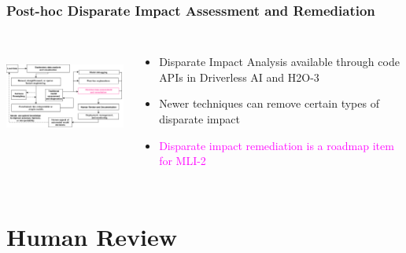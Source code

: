 \documentclass[11pt,
               aspectratio=169,
               hyperref={colorlinks}
               ]{beamer}
\begin{document}
		\begin{frame}
		
			\frametitle{Post-hoc Disparate Impact Assessment and Remediation}		
			
			\begin{columns}
	
				\centering
				\includegraphics[height=100pt]{img/fair.png}
				
				\vspace{-5pt}
				\begin{itemize}
					\item Disparate Impact Analysis available through code APIs in Driverless AI and H2O-3
					\item Newer techniques can remove certain types of disparate impact 
					\item \textcolor{magenta}{Disparate impact remediation is a roadmap item for MLI-2}
				\end{itemize}
				
			\end{columns}
		
		\end{frame}

	\section{Human Review}
\end{document}
